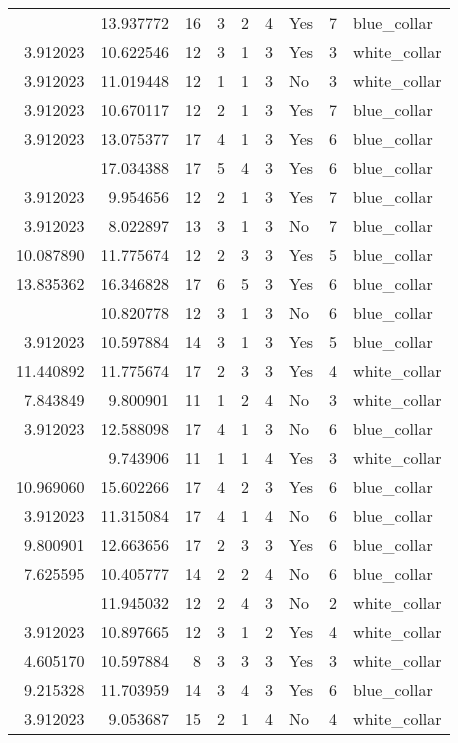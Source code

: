 \documentclass[
]{article}
\begin{document}
\begin{longtable}[t]{rrrrrllrl}
\addlinespace
12.206323 & 13.937772 & 16 & 3 & 2 & 4 & Yes & 7 & blue\_collar\\
3.912023 & 10.622546 & 12 & 3 & 1 & 3 & Yes & 3 & white\_collar\\
3.912023 & 11.019448 & 12 & 1 & 1 & 3 & No & 3 & white\_collar\\
3.912023 & 10.670117 & 12 & 2 & 1 & 3 & Yes & 7 & blue\_collar\\
3.912023 & 13.075377 & 17 & 4 & 1 & 3 & Yes & 6 & blue\_collar\\
\addlinespace
11.951503 & 17.034388 & 17 & 5 & 4 & 3 & Yes & 6 & blue\_collar\\
3.912023 & 9.954656 & 12 & 2 & 1 & 3 & Yes & 7 & blue\_collar\\
3.912023 & 8.022897 & 13 & 3 & 1 & 3 & No & 7 & blue\_collar\\
10.087890 & 11.775674 & 12 & 2 & 3 & 3 & Yes & 5 & blue\_collar\\
13.835362 & 16.346828 & 17 & 6 & 5 & 3 & Yes & 6 & blue\_collar\\
\addlinespace
3.912023 & 10.820778 & 12 & 3 & 1 & 3 & No & 6 & blue\_collar\\
3.912023 & 10.597884 & 14 & 3 & 1 & 3 & Yes & 5 & blue\_collar\\
11.440892 & 11.775674 & 17 & 2 & 3 & 3 & Yes & 4 & white\_collar\\
7.843849 & 9.800901 & 11 & 1 & 2 & 4 & No & 3 & white\_collar\\
3.912023 & 12.588098 & 17 & 4 & 1 & 3 & No & 6 & blue\_collar\\
\addlinespace
3.912023 & 9.743906 & 11 & 1 & 1 & 4 & Yes & 3 & white\_collar\\
10.969060 & 15.602266 & 17 & 4 & 2 & 3 & Yes & 6 & blue\_collar\\
3.912023 & 11.315084 & 17 & 4 & 1 & 4 & No & 6 & blue\_collar\\
9.800901 & 12.663656 & 17 & 2 & 3 & 3 & Yes & 6 & blue\_collar\\
7.625595 & 10.405777 & 14 & 2 & 2 & 4 & No & 6 & blue\_collar\\
\addlinespace
10.128629 & 11.945032 & 12 & 2 & 4 & 3 & No & 2 & white\_collar\\
3.912023 & 10.897665 & 12 & 3 & 1 & 2 & Yes & 4 & white\_collar\\
4.605170 & 10.597884 & 8 & 3 & 3 & 3 & Yes & 3 & white\_collar\\
9.215328 & 11.703959 & 14 & 3 & 4 & 3 & Yes & 6 & blue\_collar\\
3.912023 & 9.053687 & 15 & 2 & 1 & 4 & No & 4 & white\_collar\\

\end{longtable}
\end{document}
